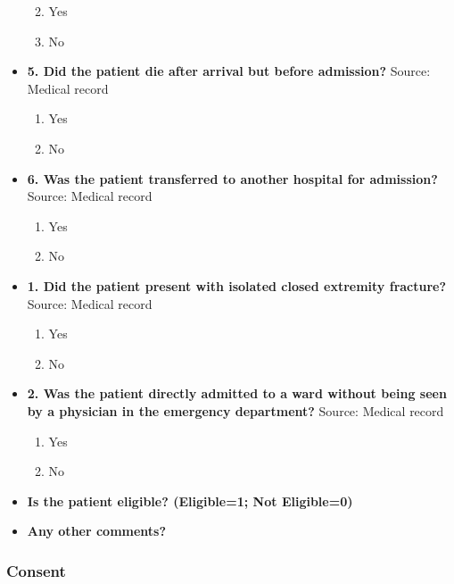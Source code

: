 \documentclass[
]{scrartcl}
\providecommand{\tightlist}{%
  \setlength{\itemsep}{0pt}\setlength{\parskip}{0pt}}\usepackage{longtable,booktabs,array}
\begin{document}
\begin{itemize}
  \begin{enumerate}
  \def\labelenumi{\arabic{enumi}.}
  \tightlist
  \item
    Yes
  \item
    No
  \end{enumerate}
\item
  \textbf{5. Did the patient die after arrival but before admission?}
  Source: Medical record

  \begin{enumerate}
  \def\labelenumi{\arabic{enumi}.}
  \tightlist
  \item
    Yes
  \item
    No
  \end{enumerate}
\item
  \textbf{6. Was the patient transferred to another hospital for
  admission?} Source: Medical record

  \begin{enumerate}
  \def\labelenumi{\arabic{enumi}.}
  \tightlist
  \item
    Yes
  \item
    No
  \end{enumerate}
\item
  \textbf{1. Did the patient present with isolated closed extremity
  fracture?} Source: Medical record

  \begin{enumerate}
  \def\labelenumi{\arabic{enumi}.}
  \tightlist
  \item
    Yes
  \item
    No
  \end{enumerate}
\item
  \textbf{2. Was the patient directly admitted to a ward without being
  seen by a physician in the emergency department?} Source: Medical
  record

  \begin{enumerate}
  \def\labelenumi{\arabic{enumi}.}
  \tightlist
  \item
    Yes
  \item
    No
  \end{enumerate}
\item
  \textbf{Is the patient eligible? (Eligible=1; Not Eligible=0)}
\item
  \textbf{Any other comments?}
\end{itemize}

\hypertarget{consent}{%
\subsubsection{Consent}\label{consent}}
\end{document}

